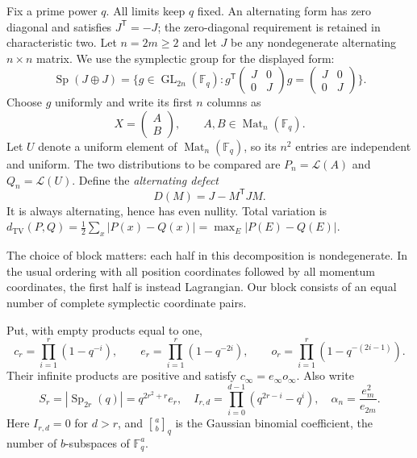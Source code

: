 \documentclass[11pt]{article}
\theoremstyle{definition}\newtheorem{definition}[theorem]{Definition}
\theoremstyle{remark}\newtheorem{remark}[theorem]{Remark}
\newcommand{\F}{\mathbb F}
\newcommand{\TV}{d_{\mathrm{TV}}}
\newcommand{\Law}{\mathcal L}
\newcommand{\Mat}{\operatorname{Mat}}
\newcommand{\Sp}{\operatorname{Sp}}
\newcommand{\GL}{\operatorname{GL}}
\newcommand{\gb}[2]{\genfrac{[}{]}{0pt}{}{#1}{#2}_{q}}
\newcommand{\1}{\mathbf 1}
\begin{document}
Fix a prime power $q$. All limits keep $q$ fixed. An alternating form has
zero diagonal and satisfies $J^{\mathsf T}=-J$; the zero-diagonal requirement
is retained in characteristic two. Let $n=2m\ge2$ and let $J$ be any
nondegenerate alternating $n\times n$ matrix. We use the symplectic group
for the displayed form:
\[
 \Sp(J\oplus J)=\{g\in\GL_{2n}(\F_q):g^{\mathsf T}
       \begin{pmatrix}J&0\\0&J\end{pmatrix}g
       =\begin{pmatrix}J&0\\0&J\end{pmatrix}\}.
\]
Choose $g$ uniformly and write its first $n$ columns as
\[
 X=\begin{pmatrix}A\\B\end{pmatrix},\qquad A,B\in\Mat_n(\F_q).
\]
Let $U$ denote a uniform element of $\Mat_n(\F_q)$, so its $n^2$ entries
are independent and uniform. The two distributions to be compared are
$P_n=\Law(A)$ and $Q_n=\Law(U)$. Define the \emph{alternating defect}
\begin{equation}\label{eq:defect}
 D(M)=J-M^{\mathsf T}JM.
\end{equation}
It is always alternating, hence has even nullity. Total variation is
$\TV(P,Q)=\frac12\sum_x|P(x)-Q(x)|=\max_E|P(E)-Q(E)|$.

The choice of block matters: each half in this decomposition is
nondegenerate. In the usual ordering with all position coordinates followed
by all momentum coordinates, the first half is instead Lagrangian. Our
block consists of an equal number of complete symplectic coordinate pairs.

Put, with empty products equal to one,
\begin{equation}\label{eq:products}
 c_r=\prod_{i=1}^{r}(1-q^{-i}),\qquad
 e_r=\prod_{i=1}^{r}(1-q^{-2i}),\qquad
 o_r=\prod_{i=1}^{r}(1-q^{-(2i-1)}).
\end{equation}
Their infinite products are positive and satisfy $c_\infty=e_\infty o_\infty$.
Also write
\[
 S_r=|\Sp_{2r}(q)|=q^{2r^2+r}e_r,\quad
 I_{r,d}=\prod_{i=0}^{d-1}(q^{2r-i}-q^i),\quad
 \alpha_n=\frac{e_m^2}{e_{2m}}.
\]
Here $I_{r,d}=0$ for $d>r$, and $\gb ab$ is the Gaussian binomial
coefficient, the number of $b$-subspaces of $\F_q^a$.
\end{document}
